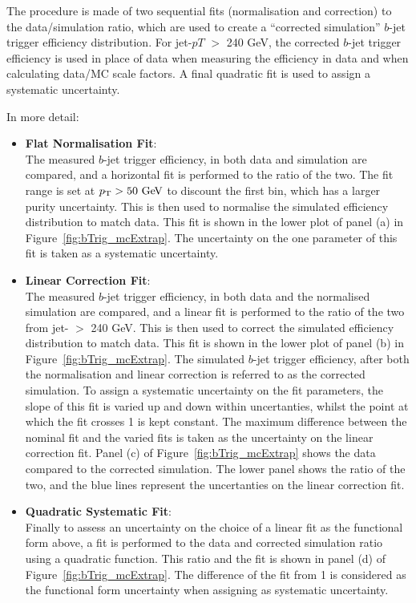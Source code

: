 The procedure is made of two sequential fits (normalisation and correction) to the data/simulation ratio,
which are used to create a ``corrected simulation'' $b$-jet trigger efficiency distribution.
For jet-$pT$ $>$ 240 GeV, the corrected $b$-jet trigger efficiency is used in place of data when measuring the efficiency in data 
and when calculating data/MC scale factors.
A final quadratic fit is used to assign a systematic uncertainty. 

\noindent
In more detail:
\begin{itemize}
  \setlength\itemsep{1em}
\item \textbf{Flat Normalisation Fit}: \\
  The measured $b$-jet trigger efficiency, in both data and simulation are compared,
  and a horizontal fit is performed to the ratio of the two.
  The fit range is set at $\pT{} > 50\GeV$ to discount the first bin, which has a larger purity uncertainty.
  This is then used to normalise the simulated efficiency distribution to match data.
  This fit is shown in the lower plot  of panel (a) in Figure~\ref{fig:bTrig_mcExtrap}.
  The uncertainty on the one parameter of this fit is taken as a systematic uncertainty.
  
\item \textbf{Linear Correction Fit}:  \\
  The measured $b$-jet trigger efficiency, in both data and the normalised simulation are compared,
  and a linear fit is performed to the ratio of the two from jet-\pT{} $>$ 240 GeV.
  This is then used to correct the simulated efficiency distribution to match data.
  This fit is shown in the lower plot of panel (b) in Figure~\ref{fig:bTrig_mcExtrap}.
  The simulated $b$-jet trigger efficiency, after both the normalisation and linear correction is referred to as the corrected simulation.
  To assign a systematic uncertainty on the fit parameters, the slope of this fit is varied up and down within uncertanties,
  whilst the point at which the fit crosses 1 is kept constant.
  The maximum difference between the nominal fit and the varied fits is taken as the uncertainty on the linear correction fit.
  Panel (c) of Figure~\ref{fig:bTrig_mcExtrap} shows the data compared to the corrected simulation.
  The lower panel shows the ratio of the two, and the blue lines represent the uncertanties on the linear correction fit.
  
\item \textbf{Quadratic Systematic Fit}: \\
  Finally to assess an uncertainty on the choice of a linear fit as the functional form above,
  a fit is performed to the data and corrected simulation ratio using a quadratic function.
  This ratio and the fit is shown in panel (d) of Figure~\ref{fig:bTrig_mcExtrap}.
  The difference of the fit from 1 is considered as the functional form uncertainty when assigning as systematic uncertainty.
  
\end{itemize}


